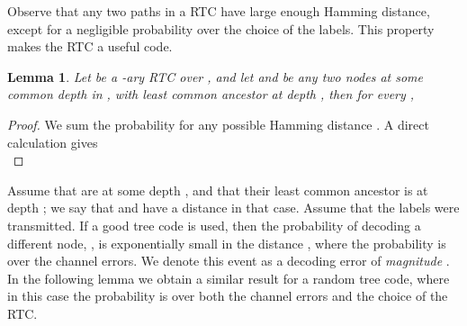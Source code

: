 \documentclass[ letterpaper, 11pt]{article}
\newtheorem{lemma}[theorem]{Lemma}
\newcommand{\RTBC}{\textsf{RTC}\xspace}
\begin{document}
Observe that any two paths in a \RTBC have large enough Hamming distance, except for  a
negligible probability over the choice of the labels. This property makes the \RTBC a useful code.
\begin{lemma}\label{lem:prob4smallHamming}
Let  be a -ary \RTBC over ,
and let  and  be any two nodes at some common depth  in ,
with least common ancestor  at depth , then for every ,

\end{lemma}
\begin{proof}
We sum the probability for any possible Hamming distance . A direct calculation gives\\

\end{proof}\vspace{-0.5em}
Assume that  are at some depth ,
and that their least common ancestor is at depth ;
we say that  and  have a distance  in that case.
Assume that the labels  were transmitted.
If a good tree code is used, then the probability of decoding a different node, , is
exponentially small in the distance , where the probability is
over the channel errors. We denote this event as a
decoding error of \emph{magnitude} .
In the following lemma we obtain a similar
result for a random tree code,
where in this case the probability is over both the channel errors and the choice of the \RTBC.
\end{document}
